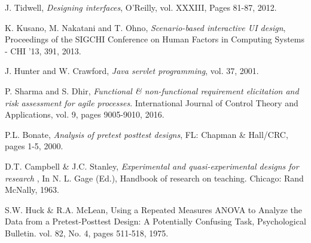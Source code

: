 \begin{thebibliography}{1}
	 J. Tidwell, {\em Designing interfaces}, O'Reilly, vol. XXXIII, Pages 81-87, 2012.
	
	 K. Kusano, M. Nakatani and T. Ohno, {\em Scenario-based interactive UI design}, Proceedings of the SIGCHI Conference on Human Factors in Computing Systems - CHI '13, 391,  2013.
	
	 J. Hunter and W. Crawford, {\em Java servlet programming}, vol. 37, 2001.
	
	 P. Sharma and S. Dhir, {\em Functional \& non-functional requirement elicitation and risk assessment for agile processes}. International Journal of Control Theory and Applications, vol. 9, pages 9005-9010, 2016.
	
	 P.L. Bonate, {\em Analysis of pretest posttest designs}, FL: Chapman \& Hall/CRC, pages 1-5, 2000.
	
	 D.T. Campbell \& J.C. Stanley, {\em Experimental and quasi-experimental designs for research }, In N. L. Gage (Ed.), Handbook of research on teaching. Chicago: Rand McNally, 1963.
	
	 S.W. Huck \& R.A. McLean, Using a Repeated Measures ANOVA to Analyze the Data from a Pretest-Posttest Design: A Potentially Confusing Task, Psychological Bulletin. vol. 82, No. 4, pages 511-518, 1975. 
	
	
\end{thebibliography}



